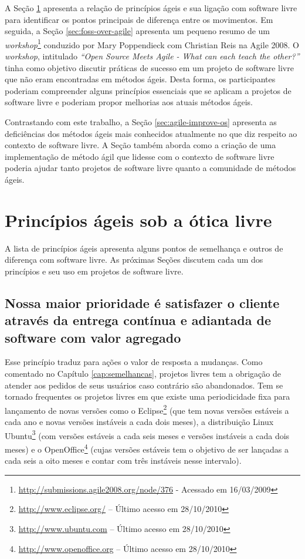 A Seção \ref{sec:principles} apresenta a relação de princípios ágeis e
sua ligação com software livre para identificar os pontos principais
de diferença entre os movimentos. Em seguida, a Seção
\ref{sec:foss-over-agile} apresenta um pequeno resumo de um
\textit{workshop}\footnote{\url{http://submissions.agile2008.org/node/376}
  - Acessado em 16/03/2009} conduzido por Mary Poppendieck com
Christian Reis na Agile 2008. O \textit{workshop}, intitulado
\textit{``Open Source Meets Agile - What can each teach the other?''}
tinha como objetivo discutir práticas de sucesso em um projeto de
software livre que não eram encontradas em métodos ágeis. Desta forma,
os participantes poderiam compreender alguns princípios essenciais que
se aplicam a projetos de software livre e poderiam propor melhorias
aos atuais métodos ágeis.

Contrastando com este trabalho, a Seção \ref{sec:agile-improve-os}
apresenta as deficiências dos métodos ágeis mais conhecidos atualmente
no que diz respeito ao contexto de software livre. A Seção também
aborda como a criação de uma implementação de método ágil que lidesse
com o contexto de software livre poderia ajudar tanto projetos de
software livre quanto a comunidade de métodos ágeis.

\section{Princípios ágeis sob a ótica livre}
\label{sec:principles}

A lista de princípios ágeis apresenta alguns pontos de semelhança e
outros de diferença com software livre. As próximas Seções discutem
cada um dos princípios e seu uso em projetos de software livre.

\subsection[Satisfação do cliente]{Nossa maior prioridade é satisfazer
  o cliente através da entrega contínua e adiantada de software com
  valor agregado}

Esse princípio traduz para ações o valor de resposta a mudanças. Como
comentado no Capítulo \ref{cap:semelhancas}, projetos livres tem a
obrigação de atender aos pedidos de seus usuários caso contrário são
abandonados. Tem se tornado frequentes os projetos livres em que
existe uma periodicidade fixa para lançamento de novas versões como o
Eclipse\footnote{\url{http://www.eclipse.org/} -- Último acesso em
  28/10/2010} (que tem novas versões estáveis a cada ano e novas
versões instáveis a cada dois meses), a distribuição Linux
Ubuntu\footnote{\url{http://www.ubuntu.com} -- Último acesso em
  28/10/2010} (com versões estáveis a cada seis meses e versões
instáveis a cada dois meses) e o
OpenOffice\footnote{\url{http://www.openoffice.org} -- Último acesso
  em 28/10/2010} (cujas versões estáveis tem o objetivo de ser
lançadas a cada seis a oito meses e contar com três instáveis nesse
intervalo).

